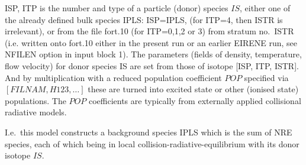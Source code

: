 \begin{description}
\begin{description}
                ISP, ITP is the number and type of a particle (donor) species $IS$, either one
                of the already defined bulk species IPLS: ISP=IPLS, (for ITP=4, then ISTR is
                irrelevant), or from the file fort.10 (for ITP=0,1,2 or 3) from stratum no.\
                ISTR (i.e. written onto fort.10 either in the present run or an earlier EIRENE
                run, see NFILEN option in input block 1).
                The parameters (fields of density, temperature, flow velocity) for donor
                species IS are set from those of isotope [ISP, ITP, ISTR].
                And by multiplication with a reduced population coefficient $POP$ specified via
                $[FILNAM, H123, \dots]$ these are turned into excited state or other (ionised
                state) populations.
                The $POP$ coefficients are typically from externally applied collisional
                radiative models.

                I.e.\ this model constructs a background species IPLS which is the sum of NRE
                species, each of which being in local collision-radiative-equilibrium with its
                donor isotope $IS$.
        \end{description}
\end{description}

